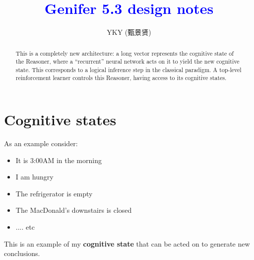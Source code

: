 \documentclass[12pt]{article}
\title{\textcolor{blue}{Genifer 5.3 design notes}}
\author{YKY (甄景贤)}
\newcommand{\tab}{\hspace*{1cm}}
\begin{document}



\maketitle
\setlength{\parindent}{0em}
\setlength{\parskip}{2.5ex plus0.5ex minus1.2ex}

\begin{abstract}
This is a completely new architecture: a long vector represents the cognitive state of the Reasoner, where a ``recurrent'' neural network acts on it to yield the new cognitive state.  This corresponds to a logical inference step in the classical paradigm.  A top-level reinforcement learner controls this Reasoner, having access to its cognitive states.
\end{abstract}

\setlength{\abovecaptionskip}{-10ex}
\setlength{\belowcaptionskip}{-18ex}

\setlength{\oddsidemargin}{1cm}
\setlength{\evensidemargin}{1cm}
\setlength{\textwidth}{14cm}

\linespread{1.2}

\section{Cognitive states}

As an example consider:
\begin{itemize}
\item It is 3:00AM in the morning
\item I am hungry
\item The refrigerator is empty
\item The MacDonald's downstairs is closed
\item .... etc
\end{itemize}
This is an example of my \textbf{cognitive state} that can be acted on to generate new conclusions.
\end{document}
